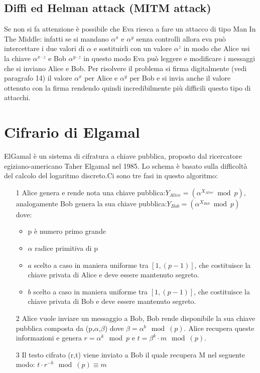 \documentclass[10pt,a4paper]{article}
\begin{document}
\subsection{Diffi ed  Helman attack (MITM attack)}
Se non si fa attenzione è possibile che Eva riesca a fare un attacco di tipo Man In The Middle: infatti se si mandano $\alpha^x$ e $\alpha^y$ senza controlli allora eva può intercettare i due valori di $\alpha$ e sostituirli con un valore $\alpha^z$ in modo che Alice usi la chiave $\alpha^{x\cdot z}$ e Bob $\alpha^{y\cdot z}$ in questo modo Eva può leggere e modificare i messaggi che si inviano Alice e Bob. Per risolvere il problema si firma digitalmente (vedi paragrafo 14) il valore $\alpha^x$ per Alice e $\alpha^y$ per Bob e si invia anche il valore ottenuto con la firma rendendo quindi incredibilmente più difficili questo tipo di attacchi.

\section{Cifrario di Elgamal}
ElGamal è un sistema di cifratura a chiave pubblica, proposto dal ricercatore egiziano-americano Taher Elgamal nel 1985. Lo schema è basato sulla difficoltà del calcolo del logaritmo discreto.Ci sono tre fasi in questo algoritmo:
\begin{itemize}
\item[1] Alice genera e rende nota una chiave pubblica:$Y_{Alice} = (\alpha^{X_{Alice}} \bmod p)$, analogamente Bob genera la sua chiave pubblica:$Y_{Bob} = (\alpha^{X_{Bob}} \bmod p)$ dove:
\begin{itemize}
\item p è numero primo grande
\item $\alpha$ radice primitiva di p
\item $a$ scelto a caso in maniera uniforme tra $[1,(p-1)]$, che costituisce la chiave privata di Alice e deve essere mantenuto segreto.
\item $b$ scelto a caso in maniera uniforme tra $[1,(p-1)]$, che costituisce la chiave privata di Bob e deve essere mantenuto segreto.
\end{itemize} 
\item[2] Alice vuole inviare un messaggio a Bob, Bob rende disponibile la sua chiave pubblica composta da (p,$\alpha$,$\beta$) dove $\beta = \alpha^b \mod(p)$. Alice recupera queste informazioni e genera $r=\alpha^k\mod p$ e $t=\beta^k\cdot m \mod(p)$.
\item[3] Il testo cifrato (r,t) viene inviato a Bob il quale recupera M nel seguente modo: $t\cdot r^{-b} \mod(p) \equiv m$ 
\end{itemize}
\end{document}
